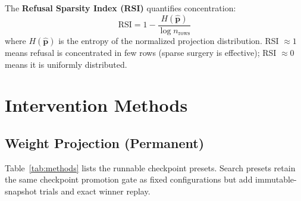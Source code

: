\documentclass[11pt]{article}
\begin{document}
The \textbf{Refusal Sparsity Index (RSI)} quantifies concentration:
\begin{equation}
    \text{RSI} = 1 - \frac{H(\hat{\mathbf{p}})}{\log n_{\text{rows}}}
\end{equation}
where $H(\hat{\mathbf{p}})$ is the entropy of the normalized projection distribution. RSI $\approx 1$ means refusal is concentrated in few rows (sparse surgery is effective); RSI $\approx 0$ means it is uniformly distributed.

\section{Intervention Methods}
\label{sec:intervention}

\subsection{Weight Projection (Permanent)}
\label{sec:weight_projection}

Table~\ref{tab:methods} lists the runnable checkpoint presets. Search presets retain the same checkpoint promotion gate as fixed configurations but add immutable-snapshot trials and exact winner replay.
\end{document}
